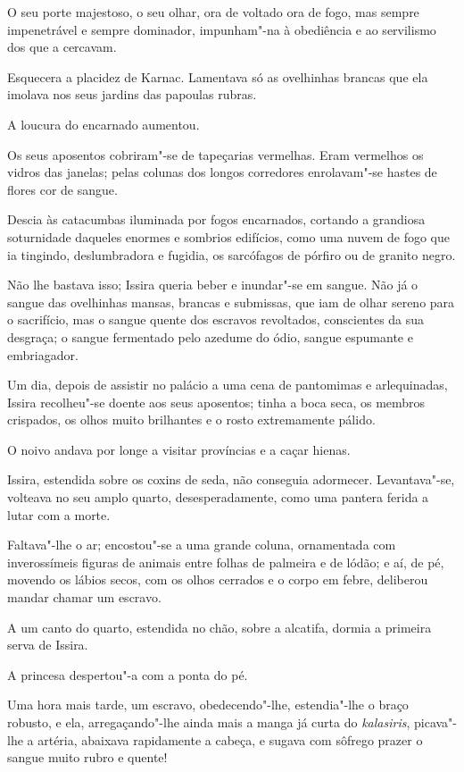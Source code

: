 O seu porte majestoso, o seu olhar, ora de voltado ora de fogo, mas
sempre impenetrável e sempre dominador, impunham"-na à obediência e ao
servilismo dos que a cercavam.

Esquecera a placidez de Karnac. Lamentava só as ovelhinhas brancas que
ela imolava nos seus jardins das papoulas rubras.

A loucura do encarnado aumentou.

Os seus aposentos cobriram"-se de tapeçarias vermelhas. Eram vermelhos os
vidros das janelas; pelas colunas dos longos corredores enrolavam"-se
hastes de flores cor de sangue.

Descia às catacumbas iluminada por fogos encarnados, cortando a
grandiosa soturnidade daqueles enormes e sombrios edifícios, como uma
nuvem de fogo que ia tingindo, deslumbradora e fugidia, os sarcófagos de
pórfiro ou de granito negro.

Não lhe bastava isso; Issira queria beber e inundar"-se em sangue. Não já
o sangue das ovelhinhas mansas, brancas e submissas, que iam de olhar
sereno para o sacrifício, mas o sangue quente dos escravos revoltados,
conscientes da sua desgraça; o sangue fermentado pelo azedume do ódio,
sangue espumante e embriagador.

Um dia, depois de assistir no palácio a uma cena de pantomimas e
arlequinadas, Issira recolheu"-se doente aos seus aposentos; tinha a boca
seca, os membros crispados, os olhos muito brilhantes e o rosto
extremamente pálido.

O noivo andava por longe a visitar províncias e a caçar hienas.

Issira, estendida sobre os coxins de seda, não conseguia adormecer.
Levantava"-se, volteava no seu amplo quarto, desesperadamente, como uma
pantera ferida a lutar com a morte.

Faltava"-lhe o ar; encostou"-se a uma grande coluna, ornamentada com
inverossímeis figuras de animais entre folhas de palmeira e de lódão; e
aí, de pé, movendo os lábios secos, com os olhos cerrados e o corpo em
febre, deliberou mandar chamar um escravo.

A um canto do quarto, estendida no chão, sobre a alcatifa, dormia a
primeira serva de Issira.

A princesa despertou"-a com a ponta do pé.

Uma hora mais tarde, um escravo, obedecendo"-lhe, estendia"-lhe o braço
robusto, e ela, arregaçando"-lhe ainda mais a manga já curta do
\emph{kalasiris}, picava"-lhe a artéria, abaixava rapidamente a cabeça, e
sugava com sôfrego prazer o sangue muito rubro e quente!

